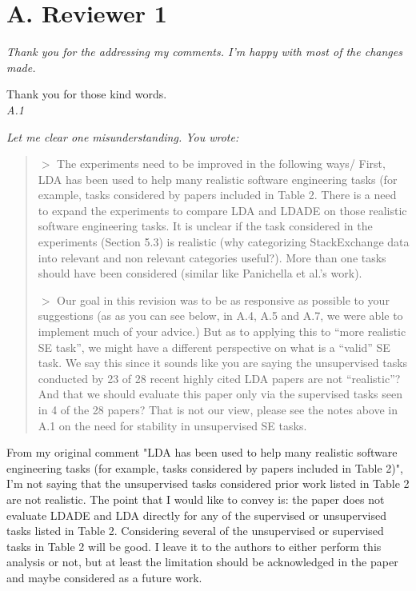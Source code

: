 \documentclass[twocolumn,5p,sort&compress]{elsarticle}
\theoremstyle{break}
\begin{document}
\newpage
\section*{A. Reviewer 1}

\textit{Thank you for the addressing my comments. I'm happy with most of the changes made.\\}

Thank you for those kind words.\\

\textit{A.1\\}
{\em Let me clear one misunderstanding.
You wrote:
\begin{quote}

$>$ The experiments need to be improved in the following ways/ First, LDA has been used to help many realistic software engineering tasks (for example, tasks considered by papers included in Table 2. There is a need to expand the experiments to compare LDA and LDADE on those realistic software engineering tasks. It is unclear if the task considered in the experiments (Section 5.3) is realistic (why categorizing StackExchange data into relevant and non relevant categories useful?). More than one tasks should have been considered (similar like Panichella et al.’s work). 

$>$ Our goal in this revision was to be as responsive as possible to your suggestions (as as you can see below, in A.4, A.5 and A.7, we were able to implement much of your advice.) But as to applying this to “more realistic SE task”, we might have a different perspective on what is a “valid” SE task. 
We say this since it sounds like you are saying the unsupervised tasks conducted by 23 of 28 recent highly cited LDA papers are not “realistic”? And that we should evaluate this paper only via the supervised tasks seen in 4 of the 28 papers? That is not our view, please see the notes above in A.1 on the need for stability in unsupervised SE tasks.
\end{quote}

From my original comment "LDA has been used to help many realistic software engineering tasks (for example, tasks considered by papers included in Table 2)", I'm not saying that the unsupervised tasks considered prior work listed in Table 2 are not realistic. The point that I would like to convey is: the paper does not evaluate LDADE and LDA directly for any of the supervised or unsupervised tasks listed in Table 2. Considering several of the unsupervised or supervised tasks in Table 2 will be good.  I leave it to the authors to either perform this analysis or not, but at least the limitation should be acknowledged in the paper and maybe considered as  a future work.\\}
\end{document}
